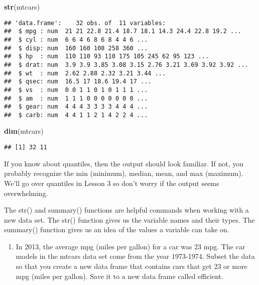 \documentclass[]{article}
\newenvironment{Shaded}{\begin{snugshade}}{\end{snugshade}}
\newcommand{\KeywordTok}[1]{\textcolor[rgb]{0.13,0.29,0.53}{\textbf{#1}}}
\newcommand{\NormalTok}[1]{#1}
\providecommand{\tightlist}{%
  \setlength{\itemsep}{0pt}\setlength{\parskip}{0pt}}
\begin{document}
\begin{Shaded}
\begin{Highlighting}[]
\KeywordTok{str}\NormalTok{(mtcars)}
\end{Highlighting}
\end{Shaded}

\begin{verbatim}
## 'data.frame':    32 obs. of  11 variables:
##  $ mpg : num  21 21 22.8 21.4 18.7 18.1 14.3 24.4 22.8 19.2 ...
##  $ cyl : num  6 6 4 6 8 6 8 4 4 6 ...
##  $ disp: num  160 160 108 258 360 ...
##  $ hp  : num  110 110 93 110 175 105 245 62 95 123 ...
##  $ drat: num  3.9 3.9 3.85 3.08 3.15 2.76 3.21 3.69 3.92 3.92 ...
##  $ wt  : num  2.62 2.88 2.32 3.21 3.44 ...
##  $ qsec: num  16.5 17 18.6 19.4 17 ...
##  $ vs  : num  0 0 1 1 0 1 0 1 1 1 ...
##  $ am  : num  1 1 1 0 0 0 0 0 0 0 ...
##  $ gear: num  4 4 4 3 3 3 3 4 4 4 ...
##  $ carb: num  4 4 1 1 2 1 4 2 2 4 ...
\end{verbatim}

\begin{Shaded}
\begin{Highlighting}[]
\KeywordTok{dim}\NormalTok{(mtcars)}
\end{Highlighting}
\end{Shaded}

\begin{verbatim}
## [1] 32 11
\end{verbatim}

If you know about quantiles, then the output should look familiar. If
not, you probably recognize the min (minimum), median, mean, and max
(maximum). We'll go over quantiles in Lesson 3 so don't worry if the
output seems overwhelming.

The str() and summary() functions are helpful commands when working with
a new data set. The str() function gives us the variable names and their
types. The summary() function gives us an idea of the values a variable
can take on.

\begin{enumerate}
\def\labelenumi{\arabic{enumi}.}
\setcounter{enumi}{1}
\tightlist
\item
  In 2013, the average mpg (miles per gallon) for a car was 23 mpg. The
  car models in the mtcars data set come from the year 1973-1974. Subset
  the data so that you create a new data frame that contains cars that
  get 23 or more mpg (miles per gallon). Save it to a new data frame
  called efficient.
\end{enumerate}
\end{document}
